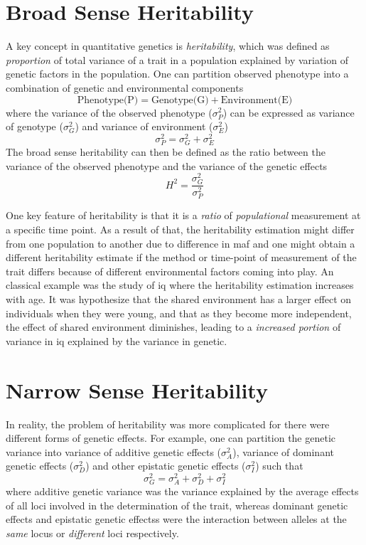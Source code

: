 \documentclass[12pt]{book}
\begin{document}
	\section{Broad Sense Heritability}

	A key concept in quantitative genetics is \emph{heritability}, which was defined as \emph{proportion} of total variance of a trait in a population explained by variation of genetic factors in the population.
	One can partition observed phenotype into a combination of genetic and environmental components\citep{Falconer1996}
	$$
	\text{Phenotype(P)}=\text{Genotype(G)}+\text{Environment(E)}
	$$
	where the variance of the observed phenotype ($\sigma_P^2$) can be expressed as variance of genotype ($\sigma_G^2$) and variance of environment ($\sigma_E^2$)
	$$
		\sigma_P^2=\sigma_G^2+\sigma_E^2
	$$
	The broad sense heritability can then be defined as the ratio between the variance of the observed phenotype and the variance of the genetic effects
	$$
	H^2=\frac{\sigma_G^2}{\sigma_P^2}
	$$
	
	One key feature of heritability is that it is a \emph{ratio} of \emph{populational} measurement at a specific time point.
	As a result of that, the heritability estimation might differ from one population to another due to difference in \gls{maf} and one might obtain a different heritability estimate if the method or time-point of measurement of the trait differs because of different environmental factors coming into play.
	An classical example was the study of \gls{iq} where the heritability estimation increases with age\citep{Bouchard2013}.
	It was hypothesize that the shared environment has a larger effect on individuals when they were young, and that as they become more independent, the effect of shared environment diminishes, leading to a \emph{increased portion} of variance in \gls{iq} explained by the variance in genetic\citep{Bouchard2013}. 
	
	\section{Narrow Sense Heritability}
	In reality, the problem of heritability was more complicated for there were different forms of genetic effects. 
	For example, one can partition the genetic variance into variance of additive genetic effects ($\sigma_A^2$), variance of dominant genetic effects ($\sigma_D^2$) and other epistatic genetic effects ($\sigma_I^2$) such that
	$$
		\sigma_G^2=\sigma_A^2+\sigma_D^2+\sigma_I^2
	$$
	where additive genetic variance was the variance explained by the average effects of all loci involved in the determination of the trait, whereas dominant genetic effects and epistatic genetic effectss were the interaction between alleles at the \emph{same} locus or \emph{different} loci respectively.
	
\end{document}
